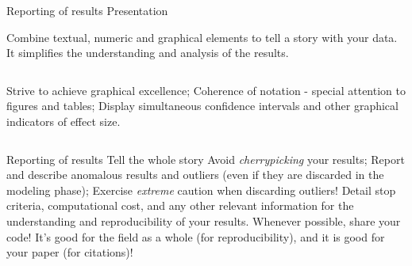 \documentclass[t]{beamer}
\begin{document}
\begin{ftst}
{Reporting of results}
{Presentation}
Combine textual, numeric and graphical elements to tell a story with your data. It simplifies the understanding and analysis of the results.
\begin{columns}[T]
	\bitems Strive to achieve graphical excellence;
		\spitem Coherence of notation - special attention to figures and tables;
		\spitem Display simultaneous confidence intervals and other graphical indicators of effect size.
	\eitem
{}
\end{columns}
\end{ftst}


\begin{ftst}
{Reporting of results}
{Tell the whole story}
Avoid \textit{cherrypicking} your results;
\vone
Report and describe anomalous results and outliers (even if they are discarded in the modeling phase);
\vone
Exercise \textit{extreme} caution when discarding outliers!
\vone
Detail stop criteria, computational cost, and any other relevant information for the understanding and reproducibility of your results.
\vone
Whenever possible, share your code! It's good for the field as a whole (for reproducibility), and it is good for your paper (for citations)!
\end{ftst}


\end{document}
